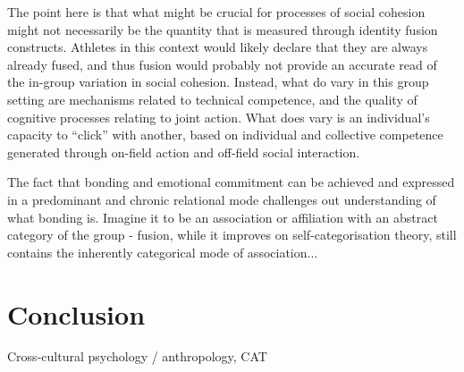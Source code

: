 \begin{CJK}{UTF8}{gbsn}
  The point here is that what might be crucial for processes of social cohesion might not necessarily be the quantity that is measured through identity fusion constructs. Athletes in this context would likely declare that they are always already fused, and thus fusion would probably not provide an accurate read of the in-group variation in social cohesion. Instead, what do vary in this group setting are mechanisms related to technical competence, and the quality of cognitive processes relating to joint action.  What does vary is an individual's capacity to ``click'' with another, based on individual and collective competence generated through on-field action and off-field social interaction.

  The fact that bonding and emotional commitment can be achieved and expressed in a predominant and chronic relational mode challenges out understanding of what bonding is.  Imagine it to be an association or affiliation with an abstract category of the group - fusion, while it improves on self-categorisation theory, still contains the inherently categorical mode of association...




  \section{Conclusion}
  Cross-cultural psychology / anthropology, CAT


                                                          \end{CJK}
